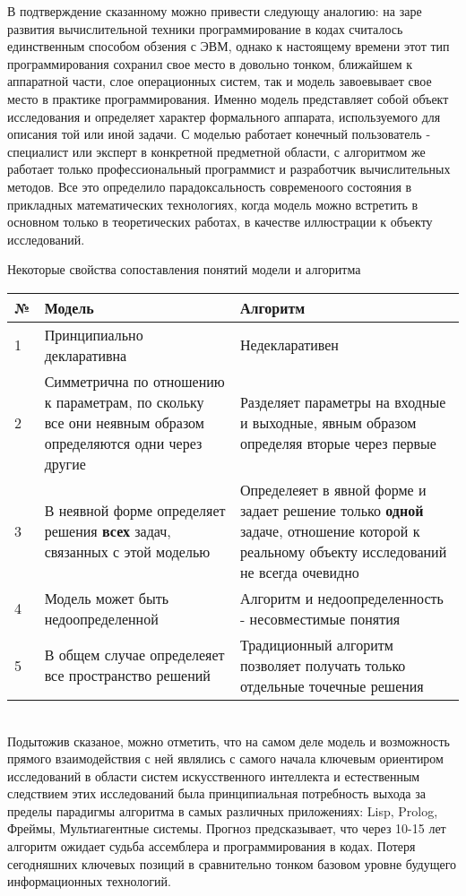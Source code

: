 \documentclass[a4paper,12pt]{report}
\begin{document}
	В подтверждение сказанному можно привести следующу аналогию: на заре развития
	вычислительной техники программирование в кодах считалось единственным
	способом обзения с ЭВМ, однако к настоящему времени этот тип программирования
	сохранил свое место в довольно тонком, ближайшем к аппаратной части, слое
	операционных систем, так и модель завоевывает свое место в практике
	программирования. Именно модель представляет собой объект исследования и
	определяет характер формального аппарата, используемого для описания той или
	иной задачи. С моделью работает конечный пользователь - специалист или
	эксперт в конкретной предметной области, с алгоритмом же работает только
	профессиональный программист и разработчик вычислительных методов. Все это
	определило парадоксальность современоого состояния в прикладных
	математических технологиях, когда модель можно встретить в основном только в
	теоретических работах, в качестве иллюстрации к объекту исследований.

	Некоторые свойства сопоставления понятий модели и алгоритма

	\begin{tabular}{ p{0.8cm} | p{7.5cm} | p{8.5cm} }
		\hline
		№ & Модель & Алгоритм \\
		\hline
		1 & Принципиально декларативна & Недекларативен \\
		\hline
		2 & Симметрична по отношению к параметрам, по скольку все они неявным
		образом определяются одни через другие
		& Разделяет параметры на входные и выходные, явным образом определяя вторые
		через первые \\
		\hline
		3 & В неявной форме определяет решения \textbf{всех} задач, связанных с
		этой моделью
		& Определеяет в явной форме и задает решение только \textbf{одной} задаче,
		отношение которой к реальному объекту исследований не всегда очевидно \\
		\hline
		4 & Модель может быть недоопределенной
		& Алгоритм и недоопределенность - несовместимые понятия \\
		\hline
		5 & В общем случае определеяет все пространство решений
		& Традиционный алгоритм позволяет получать только отдельные точечные
		решения \\
		\hline
	\end{tabular} \\

	Подытожив сказаное, можно отметить, что на самом деле модель и возможность
	прямого взаимодействия с ней являлись с самого начала ключевым ориентиром
	исследований в области систем искусственного интеллекта и естественным
	следствием этих исследований была принципиальная потребность выхода за
	пределы парадигмы алгоритма в самых различных приложениях: Lisp, Prolog,
	Фреймы, Мультиагентные системы. Прогноз предсказывает, что через 10-15 лет
	алгоритм ожидает судьба ассемблера и программирования в кодах. Потеря
	сегодняшних ключевых позиций в сравнительно тонком базовом уровне будущего
	информационных технологий.
\end{document}
